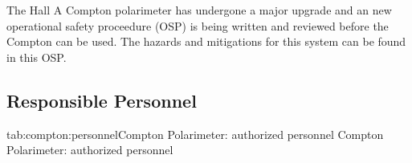 

The Hall A Compton polarimeter has undergone a major upgrade and an
new operational safety proceedure (OSP) is being written and reviewed before the
Compton can be used.   The hazards and mitigations for this system can be found in 
this OSP.

\subsection{Responsible Personnel}

\begin{namestab}{tab:compton:personnel}{Compton Polarimeter: authorized personnel}{%
          Compton Polarimeter: authorized personnel}
\end{namestab}

